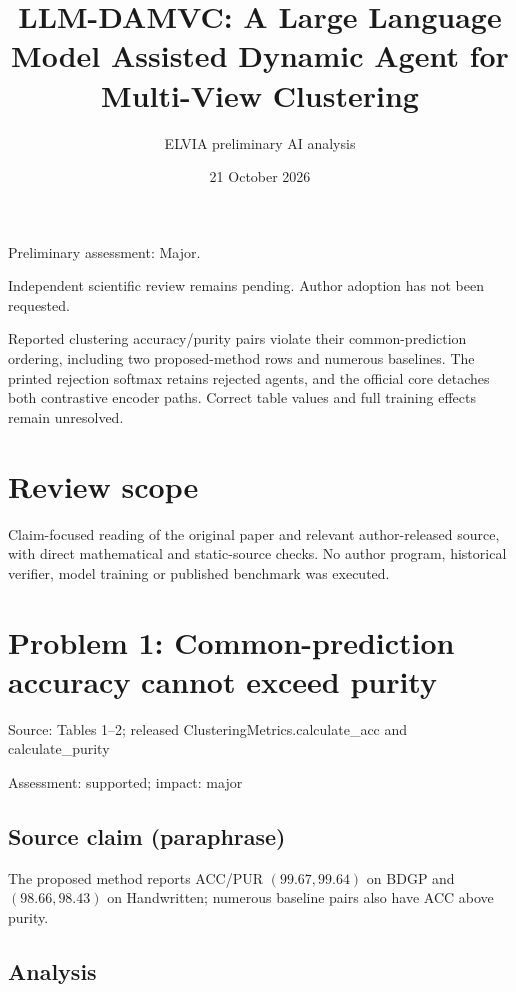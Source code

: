 \documentclass[11pt]{article}
\begin{document}
\title{LLM-DAMVC: A Large Language Model Assisted Dynamic Agent for Multi-View Clustering}

\author{ELVIA preliminary AI analysis}\date{21 October 2026}\maketitle

Preliminary assessment: Major.\par

Independent scientific review remains pending. Author adoption has not been requested.

Reported clustering accuracy/purity pairs violate their common-prediction ordering, including two proposed-method rows and numerous baselines. The printed rejection softmax retains rejected agents, and the official core detaches both contrastive encoder paths. Correct table values and full training effects remain unresolved.

\section*{Review scope}

Claim-focused reading of the original paper and relevant author-released source, with direct mathematical and static-source checks. No author program, historical verifier, model training or published benchmark was executed.

\section*{Problem 1: Common-prediction accuracy cannot exceed purity}

Source: Tables 1–2; released ClusteringMetrics.calculate\_acc and calculate\_purity

Assessment: supported; impact: major

\subsection*{Source claim (paraphrase)}

The proposed method reports ACC/PUR \((99.67,99.64)\) on BDGP and \((98.66,98.43)\) on Handwritten; numerous baseline pairs also have ACC above purity.

\subsection*{Analysis}
\end{document}
